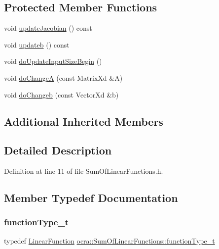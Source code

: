 \subsection*{Protected Member Functions}
\begin{DoxyCompactItemize}
\item 
void \hyperlink{classocra_1_1SumOfLinearFunctions_a4597593267a02c2087ea84a327eae5dc}{update\+Jacobian} () const
\item 
void \hyperlink{classocra_1_1SumOfLinearFunctions_ad28c3b6f03dbe68080c06c0d9e4abffa}{updateb} () const
\item 
void \hyperlink{classocra_1_1SumOfLinearFunctions_a7cfc7b9339509922c2ea6173d4d4d141}{do\+Update\+Input\+Size\+Begin} ()
\item 
void \hyperlink{classocra_1_1SumOfLinearFunctions_a49346ac5b041b40540ce0c1ae5a6b0d2}{do\+ChangeA} (const Matrix\+Xd \&A)
\item 
void \hyperlink{classocra_1_1SumOfLinearFunctions_ab66be55a88e1c4e7d4e6f663f0a36683}{do\+Changeb} (const Vector\+Xd \&b)
\end{DoxyCompactItemize}
\subsection*{Additional Inherited Members}


\subsection{Detailed Description}


Definition at line 11 of file Sum\+Of\+Linear\+Functions.\+h.



\subsection{Member Typedef Documentation}
\hypertarget{classocra_1_1SumOfLinearFunctions_ae7f2c949cbda9d69d13e64e5bfeb5fa9}{}\label{classocra_1_1SumOfLinearFunctions_ae7f2c949cbda9d69d13e64e5bfeb5fa9} 
\subsubsection{\texorpdfstring{function\+Type\+\_\+t}{functionType\_t}}
{\footnotesize\ttfamily typedef \hyperlink{classocra_1_1LinearFunction}{Linear\+Function} \hyperlink{classocra_1_1SumOfLinearFunctions_ae7f2c949cbda9d69d13e64e5bfeb5fa9}{ocra\+::\+Sum\+Of\+Linear\+Functions\+::function\+Type\+\_\+t}}



